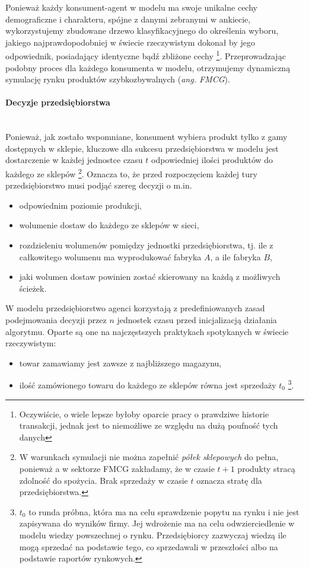 \documentclass[polish, twoside, 12pt, a4paper]{article}
\theoremstyle{definition}
\theoremstyle{plain}
\theoremstyle{remark}
\begin{document}
Ponieważ każdy konsument-agent w modelu ma swoje unikalne cechy demograficzne i charakteru, spójne z danymi zebranymi w ankiecie, wykorzystujemy zbudowane drzewo klasyfikacyjnego do określenia wyboru, jakiego najprawdopodobniej w świecie rzeczywistym dokonał by jego odpowiednik, posiadający identyczne bądź zbliżone cechy \footnote{Oczywiście, o wiele lepsze byłoby oparcie pracy o prawdziwe historie transakcji, jednak jest to niemożliwe ze względu na dużą poufność tych danych}. Przeprowadzając podobny proces dla każdego konsumenta w modelu, otrzymujemy dynamiczną symulację rynku produktów szybkozbywalnych (\textit{ang. FMCG}).

\paragraph{Decyzje przedsiębiorstwa}\mbox{}\\

Ponieważ, jak zostało wspomniane, konsument wybiera produkt tylko z gamy dostępnych w sklepie, kluczowe dla sukcesu przedsiębiorstwa w modelu jest dostarczenie w każdej jednostce czasu $t$ odpowiedniej ilości produktów do każdego ze sklepów \footnote{W warunkach symulacji nie można zapełnić \textit{półek sklepowych} do pełna, ponieważ a w sektorze FMCG zakładamy, że w czasie $t+1$ produkty stracą zdolność do spożycia. Brak sprzedaży w czasie $t$ oznacza stratę dla przedsiębiorstwa.}. Oznacza to, że przed rozpoczęciem każdej tury przedsiębiorstwo musi podjąć szereg decyzji o m.in.

	\begin{itemize}
		\item odpowiednim poziomie produkcji,
		\item wolumenie dostaw do każdego ze sklepów w sieci,
		\item rozdzieleniu wolumenów pomiędzy jednostki przedsiębiorstwa, tj. ile z całkowitego wolumenu ma wyprodukować fabryka $A$, a ile fabryka $B$,
	 	\item jaki wolumen dostaw powinien zostać skierowany na każdą z możliwych ścieżek.
\end{itemize}

W modelu przedsiębiorstwo agenci korzystają z predefiniowanych zasad podejmowania decyzji przez $n$ jednostek czasu przed inicjalizacją działania algorytmu. Oparte są one na najczęstszych praktykach spotykanych w świecie rzeczywistym: 

	\begin{itemize}
		\item towar zamawiamy jest zawsze z najbliższego magazynu,
		\item ilość zamówionego towaru do każdego ze sklepów równa jest sprzedaży $t_0$ \footnote{$t_0$ to runda próbna, która ma na celu sprawdzenie popytu na rynku i nie jest zapisywana do wyników firmy. Jej wdrożenie ma na celu odwzierciedlenie w modelu wiedzy powszechnej o rynku. Przedsiębiorcy zazwyczaj wiedzą ile mogą sprzedać na podstawie tego, co sprzedawali w przeszłości albo na podstawie raportów rynkowych.}.
	\end{itemize}
\end{document}
